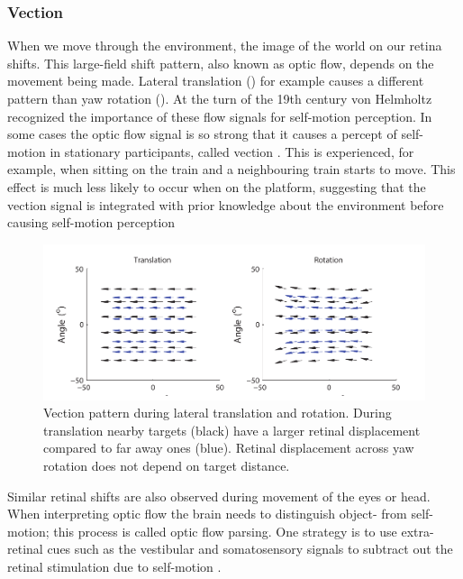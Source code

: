 \subsubsection{Vection}
When we move through the environment, the image of the world on our retina shifts. This large-field shift pattern, also known as optic flow, depends on the movement being made. Lateral translation () for example causes a different pattern than yaw rotation (). At the turn of the 19th century von Helmholtz \citeyear{vonhelmholtz1867} recognized the importance of these flow signals for self-motion perception. In some cases the optic flow signal is so strong that it causes a percept of self-motion in stationary participants, called vection \cite{dichgans1978}. This is experienced, for example, when sitting on the train and a neighbouring train starts to move. This effect is much less likely to occur when on the platform, suggesting that the vection signal is integrated with prior knowledge about the environment before causing self-motion perception \cite{andersen1985,lepecq1995}


\begin{figure}
    \includegraphics[width=1.0\textwidth]{src/intro/figures/optic_flow.pdf}

    \caption{Vection pattern during  lateral translation and  rotation. During translation nearby targets (black) have a larger retinal displacement compared to far away ones (blue). Retinal displacement across yaw rotation does not depend on target distance. }
    \label{intro:fig:vection}
\end{figure}

Similar retinal shifts are also observed during movement of the eyes or head. When interpreting optic flow the brain needs to distinguish object- from self-motion; this process is called optic flow parsing. One strategy is to use extra-retinal cues such as the vestibular and somatosensory signals to subtract out the retinal stimulation due to self-motion \cite{wertheim1994,wexler2001,macneilage2012}.

